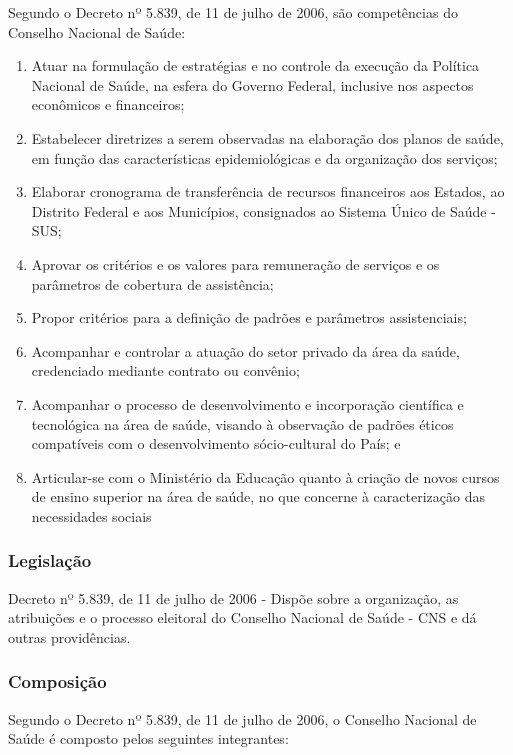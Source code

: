 Segundo o Decreto nº 5.839, de 11 de julho de 2006,
são competências do Conselho Nacional de Saúde:

\begin{enumerate}
\item 
Atuar na formulação de estratégias e no controle da
execução da Política Nacional de Saúde, na esfera do Governo
Federal, inclusive nos aspectos econômicos e financeiros;
\item 
Estabelecer diretrizes a serem observadas na elaboração dos planos
de saúde, em função das características epidemiológicas e
da organização dos serviços;
\item 
Elaborar cronograma de transferência de recursos financeiros aos
Estados, ao Distrito Federal e aos Municípios, consignados ao Sistema
\'Unico de Saúde - SUS;
\item 
Aprovar os critérios e os valores para remuneração de
serviços e os parâmetros de cobertura de assistência;
\item 
Propor critérios para a definição de padrões e parâmetros
assistenciais;
\item 
Acompanhar e controlar a atuação do setor privado da área da
saúde, credenciado mediante contrato ou convênio;
\item 
Acompanhar o processo de desenvolvimento e incorporação
científica e tecnológica na área de saúde, visando à
observação de padrões éticos compatíveis com o
desenvolvimento sócio-cultural do País; e
\item 
Articular-se com o Ministério da Educação quanto à
criação de novos cursos de ensino superior na área de saúde,
no que concerne à caracterização das necessidades sociais
\end{enumerate}

\subsubsection*{Legislação}

Decreto nº 5.839, de 11 de julho de 2006 - Dispõe
sobre a organização, as atribuições e o processo eleitoral
do Conselho Nacional de Saúde - CNS e dá outras providências.

\subsubsection*{Composição}

Segundo o Decreto nº 5.839, de 11 de julho de 2006, o
Conselho Nacional de Saúde é composto pelos seguintes integrantes:

